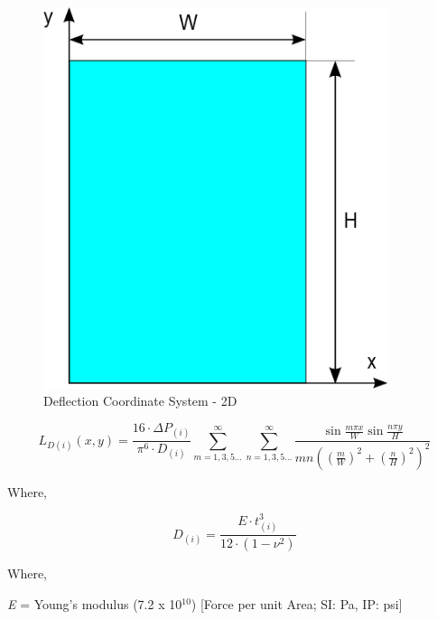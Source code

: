 \begin{figure}[hbtp] %
\centering
\includegraphics[width=0.9\textwidth, height=0.9\textheight, keepaspectratio=true]{media/image1779.png}
\caption{Deflection Coordinate System - 2D \protect \label{fig:deflection-coordinate-system-2d}}
\end{figure}

\begin{equation}
{L_{D\left( i \right)}}\left( {x,y} \right) = \frac{{16\cdot \Delta {P_{\left( i \right)}}}}{{{\pi ^6}\cdot {D_{\left( i \right)}}}}\mathop \sum \limits_{m = 1,3,5 \ldots }^\infty  \mathop \sum \limits_{n = 1,3,5 \ldots }^\infty  \frac{{\sin \frac{{m\pi x}}{W}\sin \frac{{n\pi y}}{H}}}{{mn{{\left( {{{\left( {\frac{m}{W}} \right)}^2} + {{\left( {\frac{n}{H}} \right)}^2}} \right)}^2}}}
\end{equation}

Where,

\begin{equation}
{D_{\left( i \right)}} = \frac{{E\cdot t_{\left( i \right)}^3}}{{12\cdot \left( {1 - {\nu ^2}} \right)}}
\end{equation}

Where,

\emph{E} = Young's modulus (7.2 x 10\(^{10}\)) {[}Force per unit Area; SI: Pa, IP: psi{]}

